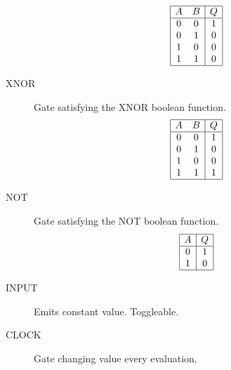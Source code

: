 \documentclass[12pt, a4paper]{article}
\begin{document}
\begin{description}
$$\begin{array}{|cc|c|}
    \hline
    A & B & Q \\
    \hline
    0 & 0 & 1 \\
    0 & 1 & 0 \\
    1 & 0 & 0 \\
    1 & 1 & 0 \\
    \hline
    \end{array}
    $$
  \item[XNOR]
    Gate satisfying the XNOR boolean function.
    $$
    \begin{array}{|cc|c|}
    \hline
    A & B & Q \\
    \hline
    0 & 0 & 1 \\
    0 & 1 & 0 \\
    1 & 0 & 0 \\
    1 & 1 & 1 \\
    \hline
    \end{array}
    $$
  \item[NOT]
    Gate satisfying the NOT boolean function.
    $$
    \begin{array}{|c|c|}
    \hline
    A & Q \\
    \hline
    0 & 1 \\
    1 & 0 \\
    \hline
    \end{array}
    $$
  \item[INPUT]
    Emits constant value. Toggleable.
  \item[CLOCK]
    Gate changing value every evaluation.
\end{description}
\end{document}
